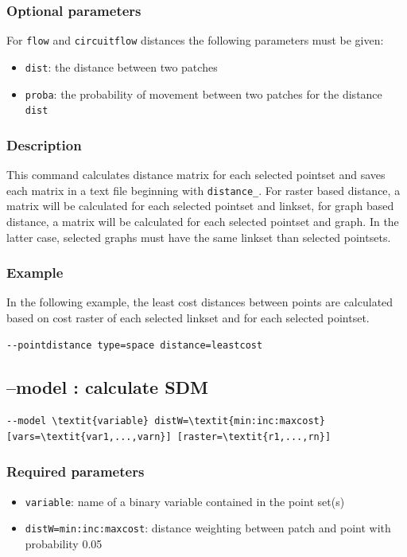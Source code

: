 \documentclass[a4paper,10pt]{report}
\begin{document}
\subsubsection{Optional parameters}
For \verb|flow| and \verb|circuitflow| distances the following parameters must be given:
\begin{itemize}
	\item \verb|dist|: the distance between two patches
	\item \verb|proba|: the probability of movement between two patches for the distance \verb|dist|
\end{itemize}

\subsubsection{Description}
This command calculates distance matrix for each selected pointset and saves each matrix in a text file beginning with \verb|distance_|.
For raster based distance, a matrix will be calculated for each selected pointset and linkset, for graph based distance, a matrix will be calculated for each selected pointset and graph. In the latter case, selected graphs must have the same linkset than selected pointsets.

\subsubsection{Example}
In the following example, the least cost distances between points are calculated based on cost raster of each selected linkset and for each selected pointset.
\begin{Verbatim}
--pointdistance type=space distance=leastcost
\end{Verbatim}


\subsection{--model : calculate SDM}
\begin{Verbatim}[commandchars=\\\{\}]
--model \textit{variable} distW=\textit{min:inc:maxcost} [vars=\textit{var1,...,varn}] [raster=\textit{r1,...,rn}]
\end{Verbatim}

\subsubsection{Required parameters}
\begin{itemize}
	\item \verb|variable|: name of a binary variable contained in the point set(s)
	\item \verb|distW=min:inc:maxcost|: distance weighting between patch and point with probability 0.05	
\end{itemize}
\end{document}
